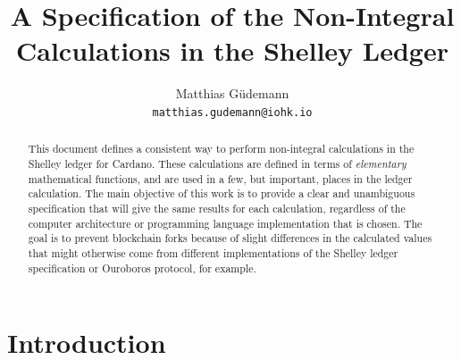 \documentclass[11pt,a4paper,dvipsnames,twosided]{article}
\theoremstyle{definition}
\theoremstyle{definition}
\begin{document}

  \cleardoublepage%
  \tableofcontents%
  \listoffigures%
  \clearpage%

  \begin{changelog}
\end{changelog}

\cleardoublepage
\renewcommand{\thepage}{\arabic{page}}
\setcounter{page}{1}

\title{A Specification of the Non-Integral Calculations in the Shelley Ledger}

\author{Matthias G\"udemann  \\ {\small \texttt{matthias.gudemann@iohk.io}}}


\maketitle

\begin{abstract}
  This document defines a consistent way to perform non-integral calculations in
  the Shelley ledger for Cardano. These calculations are defined in terms of
  \emph{elementary} mathematical functions, and are used in a few, but
  important, places in the ledger calculation.  The main objective of this work
  is to provide a clear and unambiguous specification that will give the same
  results for each calculation, regardless of the computer architecture or
  programming language implementation that is chosen.  The goal is to prevent
  blockchain forks because of slight differences in the calculated values that
  might otherwise come from different implementations of the Shelley ledger
  specification or Ouroboros protocol, for example.
\end{abstract}

\tableofcontents
\listoffigures

\section{Introduction}
\label{sec:introduction}
\end{document}
